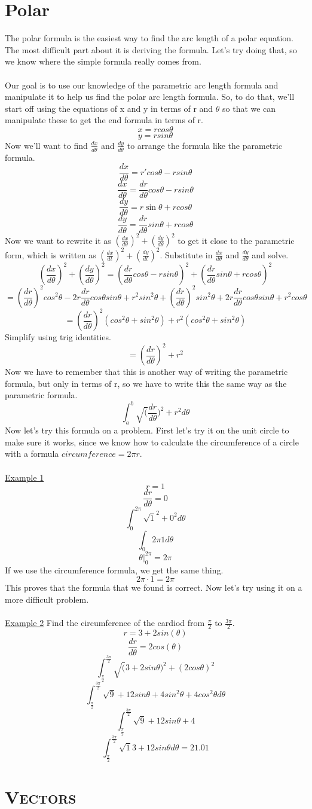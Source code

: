 \documentclass[a4paper,openright, 14pt]{article}
\newcommand{\ssection}[1]{%
\section[#1]{\centering\normalfont\scshape #1}}
\begin{document}
\section*{Polar}
The polar formula is the easiest way to find the arc length of a polar equation. The most difficult part about it is deriving the formula. Let's try doing that, so we know where the simple formula really comes from.\\\\
Our goal is to use our knowledge of the parametric arc length formula and manipulate it to help us find the polar arc length formula. So, to do that, we'll start off using the equations of x and y in terms of r and $\theta$ so that we can manipulate these to get the end formula in terms of r.
$$x=rcos\theta$$
$$y=rsin\theta$$
Now we'll want to find $\frac{dx}{d\theta}$ and $\frac{dy}{d\theta}$ to arrange the formula like the parametric formula.
$$\frac{dx}{d\theta}=r'cos\theta -rsin\theta$$
$$\frac{dx}{d\theta}=\frac{dr}{d\theta}cos\theta -rsin\theta$$
$$\frac{dy}{d\theta}=r\sin\theta +rcos\theta$$
$$\frac{dy}{d\theta}=\frac{dr}{d\theta}sin\theta +rcos\theta$$
Now we want to rewrite it as $(\frac{dx}{d\theta})^2+(\frac{dy}{d\theta})^2$ to get it close to the parametric form, which is written as $(\frac{dx}{dt})^2+(\frac{dy}{dt})^2$. Substitute in $\frac{dx}{d\theta}$ and $\frac{dy}{d\theta}$ and solve.
$$(\frac{dx}{d\theta})^2+(\frac{dy}{d\theta})^2=(\frac{dr}{d\theta}cos\theta -rsin\theta)^2+(\frac{dr}{d\theta}sin\theta +rcos\theta)^2$$
$$=(\frac{dr}{d\theta})^2cos^2\theta-2r\frac{dr}{d\theta}cos\theta sin\theta+r^2sin^2\theta+(\frac{dr}{d\theta})^2sin^2\theta+2r\frac{dr}{d\theta}cos\theta sin\theta+r^2cos\theta$$
$$=(\frac{dr}{d\theta})^2(cos^2\theta+sin^2\theta)+r^2(cos^2\theta+sin^2\theta)$$
Simplify using trig identities.
$$=(\frac{dr}{d\theta})^2+r^2$$
Now we have to remember that this is another way of writing the parametric formula, but only in terms of r, so we have to write this the same way as the parametric formula.
$$\int_{a}^{b}\sqrt(\frac{dr}{d\theta})^2+r^2 d\theta$$
Now let’s try this formula on a problem.
First let’s try it on the unit circle to make sure it works, since we know how to calculate the circumference of a circle with a formula $circumference=2\pi r$.\\\\
\underline{Example 1}
$$r=1$$
$$\frac{dr}{d\theta}=0$$
$$\int_{0}^{2\pi}\sqrt1^2+0^2 d\theta$$
$$\int_{0}{2\pi}1d\theta$$
$$\theta\vert_{0}^{2\pi}=2\pi$$
If we use the circumference formula, we get the same thing.
$$2\pi \cdot1=2\pi$$
This proves that the formula that we found is correct. Now let’s try using it on a more difficult problem.\\\\
\underline{Example 2}
Find the circumference of the cardiod from $\frac{\pi}{2}$ to $\frac{3\pi}{2}$.
$$r=3+2sin(\theta)$$ 
$$\frac{dr}{d\theta}=2cos(\theta)$$
$$\int_{\frac{\pi}{2}}^{\frac{3\pi}{2}}\sqrt(3+2sin\theta)^2+(2cos\theta)^2$$
$$\int_{\frac{\pi}{2}}^{\frac{3\pi}{2}}\sqrt9+12sin\theta+4sin^2\theta+4cos^2\theta d\theta$$
$$\int_{\frac{\pi}{2}}^{\frac{3\pi}{2}}\sqrt9+12sin\theta+4$$
$$\int_{\frac{\pi}{2}}^{\frac{3\pi}{2}}\sqrt13+12sin\theta d\theta = 21.01$$
\ssection{Vectors}
\end{document}
